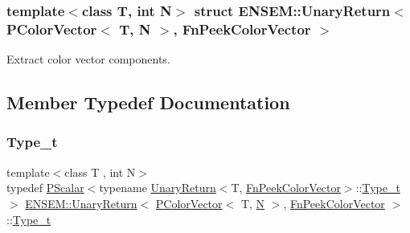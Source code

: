 \subsubsection*{template$<$class T, int N$>$\newline
struct E\+N\+S\+E\+M\+::\+Unary\+Return$<$ P\+Color\+Vector$<$ T, N $>$, Fn\+Peek\+Color\+Vector $>$}

Extract color vector components. 

\subsection{Member Typedef Documentation}
\mbox{\label{structENSEM_1_1UnaryReturn_3_01PColorVector_3_01T_00_01N_01_4_00_01FnPeekColorVector_01_4_a827d146f0d51b63a38339bc9218d64d4}} 
\subsubsection{\texorpdfstring{Type\_t}{Type\_t}\hspace{0.1cm}{\footnotesize\ttfamily [1/2]}}
{\footnotesize\ttfamily template$<$class T , int N$>$ \\
typedef \mbox{\hyperlink{classENSEM_1_1PScalar}{P\+Scalar}}$<$typename \mbox{\hyperlink{structENSEM_1_1UnaryReturn}{Unary\+Return}}$<$T, \mbox{\hyperlink{structENSEM_1_1FnPeekColorVector}{Fn\+Peek\+Color\+Vector}}$>$\+::\mbox{\hyperlink{structENSEM_1_1UnaryReturn_3_01PColorVector_3_01T_00_01N_01_4_00_01FnPeekColorVector_01_4_a827d146f0d51b63a38339bc9218d64d4}{Type\+\_\+t}}$>$ \mbox{\hyperlink{structENSEM_1_1UnaryReturn}{E\+N\+S\+E\+M\+::\+Unary\+Return}}$<$ \mbox{\hyperlink{classENSEM_1_1PColorVector}{P\+Color\+Vector}}$<$ T, \mbox{\hyperlink{operator__name__util_8cc_a7722c8ecbb62d99aee7ce68b1752f337}{N}} $>$, \mbox{\hyperlink{structENSEM_1_1FnPeekColorVector}{Fn\+Peek\+Color\+Vector}} $>$\+::\mbox{\hyperlink{structENSEM_1_1UnaryReturn_3_01PColorVector_3_01T_00_01N_01_4_00_01FnPeekColorVector_01_4_a827d146f0d51b63a38339bc9218d64d4}{Type\+\_\+t}}}

\mbox{\label{structENSEM_1_1UnaryReturn_3_01PColorVector_3_01T_00_01N_01_4_00_01FnPeekColorVector_01_4_a827d146f0d51b63a38339bc9218d64d4}} 
